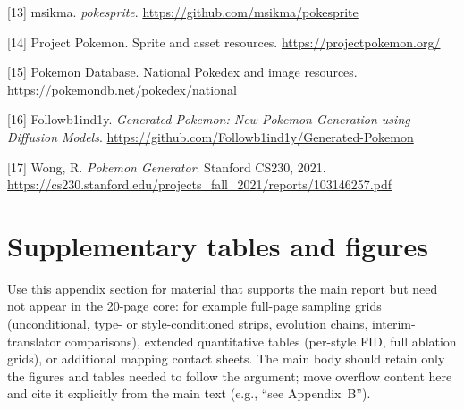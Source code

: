 \documentclass[
]{article}
\begin{document}
{[}13{]} msikma. \emph{pokesprite}.
\url{https://github.com/msikma/pokesprite}

{[}14{]} Project Pokemon. Sprite and asset resources.
\url{https://projectpokemon.org/}

{[}15{]} Pokemon Database. National Pokedex and image resources.
\url{https://pokemondb.net/pokedex/national}

{[}16{]} Followb1ind1y. \emph{Generated-Pokemon: New Pokemon Generation
using Diffusion Models}. \url{https://github.com/Followb1ind1y/Generated-Pokemon}

{[}17{]} Wong, R. \emph{Pokemon Generator}. Stanford CS230, 2021.
\url{https://cs230.stanford.edu/projects_fall_2021/reports/103146257.pdf}

\section{Supplementary tables and figures}\label{supplementary-tables-and-figures}

Use this appendix section for material that supports the main report but
need not appear in the 20-page core: for example full-page sampling grids
(unconditional, type- or style-conditioned strips, evolution chains,
interim-translator comparisons), extended quantitative tables (per-style FID,
full ablation grids), or additional mapping contact sheets. The main body
should retain only the figures and tables needed to follow the argument;
move overflow content here and cite it explicitly from the main text
(e.g., ``see Appendix~B'').
\end{document}
